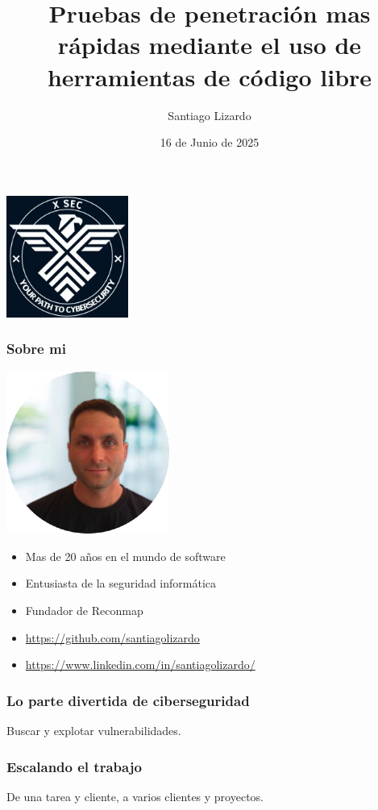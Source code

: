 \documentclass{beamer}
\title{Pruebas de penetración mas rápidas mediante el uso de herramientas de código libre}
\author{Santiago Lizardo}
\date{16 de Junio de 2025}
\begin{document}
\begin{frame}
	\begin{center}
		\includegraphics[width=0.3\textwidth]{images/xsec_logo.jpeg}
	\end{center}

	\maketitle
\end{frame}

\begin{frame}
	\frametitle{Sobre mi}

	\includegraphics[width=0.4\textwidth]{images/santiago-lizardo.png}

	\begin{itemize}
		\item Mas de 20 años en el mundo de software
		\item Entusiasta de la seguridad informática
		\item Fundador de Reconmap
		\item \url{https://github.com/santiagolizardo}
		\item \url{https://www.linkedin.com/in/santiagolizardo/}
	\end{itemize}
\end{frame}

\begin{frame}
	\frametitle{Lo parte divertida de ciberseguridad}
	Buscar y explotar vulnerabilidades.
\end{frame}

\begin{frame}
	\frametitle{Escalando el trabajo}
	De una tarea y cliente, a varios clientes y proyectos.
\end{frame}
\end{document}
